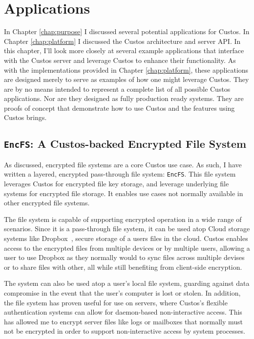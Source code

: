 \chapter{Applications}
\label{chap:clients}

In Chapter \ref{chap:purpose} I discussed several potential
applications for Custos. In Chapter \ref{chap:platform} I discussed
the Custos architecture and server API. In this chapter, I'll look
more closely at several example applications that interface with the
Custos server and leverage Custos to enhance their functionality. As
with the implementations provided in Chapter \ref{chap:platform},
these applications are designed merely to serve as examples of how one
might leverage Custos. They are by no means intended to represent a
complete list of all possible Custos applications. Nor are they
designed as fully production ready systems. They are proofs of concept
that demonstrate how to use Custos and the features using Custos
brings.

\section{\texttt{EncFS}: A Custos-backed Encrypted File System}

As discussed, encrypted file systems are a core Custos use case. As
such, I have written a layered, encrypted pass-through file system:
\texttt{EncFS}. This file system leverages Custos for encrypted file
key storage, and leverage underlying file systems for encrypted file
storage. It enables use cases not normally available in other
encrypted file systems.

The file system is capable of supporting encrypted operation in a wide
range of scenarios. Since it is a pass-through file system, it can be
used atop Cloud storage systems like Dropbox~\cite{dropbox}, secure
storage of a users files in the cloud. Custos enables access to the
encrypted files from multiple devices or by multiple users, allowing a
user to use Dropbox as they normally would to sync files across
multiple devises or to share files with other, all while still
benefiting from client-side encryption.

The system can also be used atop a user's local file system, guarding
against data compromise in the event that the user's computer is lost
or stolen. In addition, the file system has proven useful for use on
servers, where Custos's flexible authentication systems can allow for
daemon-based non-interactive access. This has allowed me to encrypt
server files like logs or mailboxes that normally must not be
encrypted in order to support non-interactive access by system
processes.

